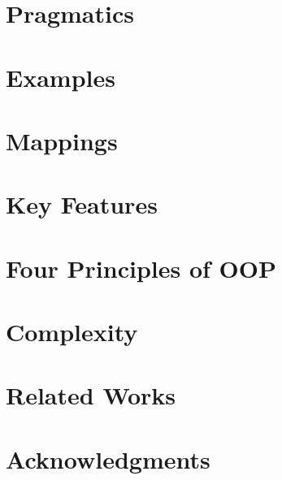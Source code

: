 \documentclass[sigplan,nonacm=true]{acmart}
\theoremstyle{theorems}
\begin{document}
\section{Pragmatics}
\label{sec:pragmatics}


\section{Examples}
\label{sec:examples}


\section{Mappings}
\label{sec:mappings}


\section{Key Features}
\label{sec:features}


\section{Four Principles of OOP}
\label{sec:four}


\section{Complexity}
\label{sec:complexity}


\section{Related Works}
\label{sec:related}


\section{Acknowledgments}



\raggedright

\clearpage
\end{document}
